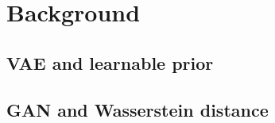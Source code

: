 \section{Background}

\subsection{VAE and learnable prior}


\subsection{GAN and Wasserstein distance}

